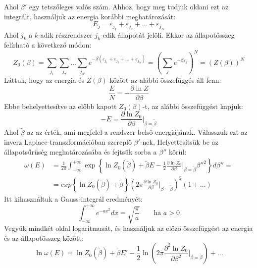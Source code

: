 \documentclass[../main.tex]{subfiles}
\begin{document}
Ahol $\beta'$ egy tetszőleges valós szám. Ahhoz, hogy meg tudjuk oldani ezt az integrált, használjuk az energia korábbi meghatározását:
\begin{equation}
    E_j = \varepsilon_{j_1} + \varepsilon_{j_2} + \ldots + \varepsilon_{j_{N}}
\end{equation}
Ahol $j_k$ a $k$-adik részrendszer $j_k$-edik állapotát jelöli. Ekkor az állapotösszeg felírható a következő módon:
\begin{equation}
    Z_0(\beta) = \sum_{j_1} \sum_{j_2} \ldots \sum_{j_N} e^{- \beta (\varepsilon_{j_1} + \varepsilon_{j_2} + \ldots + \varepsilon_{j_N})} = \left( \sum_{j} e^{- \beta \varepsilon_j} \right)^N = (Z(\beta))^N
\end{equation}
Láttuk, hogy az energia és $Z(\beta)$ között az alábbi összefüggés áll fenn:
\begin{equation}
    \frac{E}{N} = - \frac{\partial \ln Z}{\partial \beta}
\end{equation}
Ebbe behelyettesítve az előbb kapott $Z_0(\beta)$-t, az alábbi összefüggést kapjuk:
\begin{equation}
    - E = \frac{\partial \ln Z_0}{\partial \beta} \bigg\rvert_{\beta = \tilde{\beta}}
\end{equation}
Ahol $\tilde{\beta}$ az az érték, ami megfelel a rendszer belső energiájának. Válasszuk ezt az inverz Laplace-transzformációban szereplő $\beta'$-nek, Helyettesítsük be az állapotsűrűség meghatározásába 
és fejtsük sorba a $\beta''$ körül:
\begin{equation}
    \begin{aligned}
        \omega(E) &= \frac{1}{2 \pi} \int_{-\infty}^{+ \infty} \exp \left\{ \ln Z_0(\tilde{\beta}) + \tilde{\beta} E - \frac{1}{2} \frac{\partial \ln Z_0}{\partial \beta} \bigg\rvert_{\beta = \tilde{\beta}} \beta''^2 \right\} d\beta'' = \\
        &= exp \left\{\ln Z_0 (\tilde{\beta}) + \tilde{\beta} \right\} \left(2\pi \frac{\partial \ln Z_0}{\partial \beta} \bigg\rvert_{\beta = \tilde{\beta}} \right)^2 (1 + \ldots)
    \end{aligned}
\end{equation}
Itt kihasználtuk a Gauss-integrál eredményét:
\begin{equation}
    \int_{-\infty}^{+\infty} e^{- a x^2} dx = \sqrt{\frac{\pi}{a}} \qquad \text{ha } a > 0
\end{equation}
Vegyük mindkét oldal logaritmusát, és használjuk az előző összefüggést az energia és az állapotösszeg között:
\begin{equation}
    \ln \omega(E) = \ln Z_0(\tilde{\beta}) + \tilde{\beta} E' - \frac{1}{2} \ln \left( 2 \pi \frac{\partial^2 \ln Z_0}{\partial \beta^2} \bigg\rvert_{\beta = \tilde{\beta}} \right) + \ldots
\end{equation}
\end{document}
